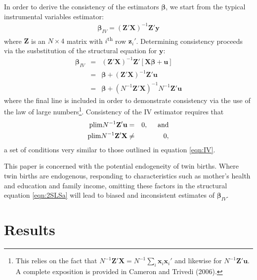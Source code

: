 \documentclass{article}[11pt,subeqn]
\newcommand{\vect}[1]{\mathbf{#1}}
\begin{document}
\begin{spacing}{1.25}
In order to derive the consistency of the estimators $\vect{\beta}$, we start from the typical instrumental variables estimator:
\begin{eqnarray}
\label{eqn:IVconsist}
\vect{\beta}_{IV}=(\vect{Z}'\vect{X})^{-1}\vect{Z}'\vect{y} \nonumber
\end{eqnarray}
where $\vect{Z}$ is an $N \times 4$ matrix with $i$\textsuperscript{th} row $\vect{z}_i'$.  Determining consistency proceeds via
the susbstitution of the structural equation for $\vect{y}$:
\begin{eqnarray}
\label{eqn:IVconsist2}
\vect{\beta}_{IV}&=&(\vect{Z}'\vect{X})^{-1}\vect{Z}'[\vect{X\beta}+\vect{u}] \nonumber\\
&=&\vect{\beta}+(\vect{Z}'\vect{X})^{-1}\vect{Z}'\vect{u}\nonumber\\
&=&\vect{\beta}+(N^{-1}\vect{Z}'\vect{X})^{-1}N^{-1}\vect{Z}'\vect{u}\nonumber
\end{eqnarray}
where the final line is included in order to demonstrate consistency via the use of the law of large numbers\footnote{This relies
on the fact that $N^{-1}\vect{Z}'\vect{X}=N^{-1}\sum_i\vect{x}_i\vect{x}_i'$ and likewise for $N^{-1}\vect{Z}'\vect{u}$.  A
complete exposition is provided in Cameron and Trivedi (2006).}.  Consistency of the IV estimator requires that
\begin{eqnarray}
\label{eqn:IVconsist3}
\mathrm{plim} N^{-1}\vect{Z'u}&=&0, \hspace{5mm}\mathrm{and} \\
\mathrm{plim} N^{-1}\vect{Z'X}&\neq&0,
\end{eqnarray}
a set of conditions very similar to those outlined in equation \ref{eqn:IV}.

This paper is concerned with the potential endogeneity of twin births.  Where twin births are endogenous, responding to
characteristics such as mother's health and education and family income, omitting these factors in the structural equation
\ref{eqn:2SLSa} will lead to biased and inconsistent estimates of $\vect{\beta}_{IV}$.

\section{Results}
\label{sec:results}

\end{spacing}
\end{document}
